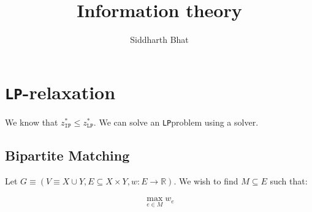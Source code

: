 \documentclass[11pt]{book}
\title{Information theory}
\author{Siddharth Bhat}
\date{}
\newcommand{\ip}{\texttt{IP} }
\newcommand{\lp}{\texttt{LP}}
\newcommand{\R}{\ensuremath{\mathbb{R}}}
\begin{document}
\maketitle
\tableofcontents

\chapter{\lp-relaxation}

We know that $z^*_\ip \leq z^*_\lp$. We can solve an \lp problem using
a solver.

\section{Bipartite Matching}
Let $G \equiv (V \equiv X \cup Y, E \subseteq X \times Y, w: E \rightarrow \R)$. We wish 
to find $M \subseteq E$ such that:

\begin{align*}
\max_{e \in M} w_e \\
\end{align*}
\end{document}
